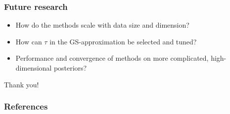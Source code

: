 \documentclass[10pt]{beamer}
\begin{document}
\begin{frame}
	\frametitle{Future research}
	\begin{itemize}
		\item How do the methods scale with data size and dimension?
		\item How can $\tau$ in the GS-approximation be selected and tuned?
		\item Performance and convergence of methods on more complicated, high-dimensional posteriors?
	\end{itemize}
\end{frame}

\begin{frame}
	\centering
	Thank you!
	\end{frame}

\begin{frame}
	\frametitle{References}
	
	
\end{frame}

\end{document}
